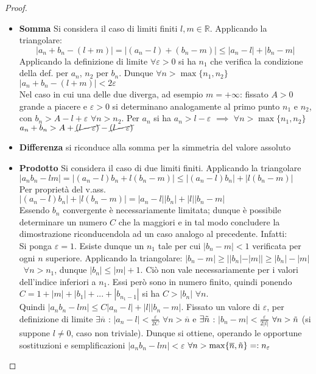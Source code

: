 \documentclass[10pt, oneside]{book}
\theoremstyle{plain}
\begin{document}
\begin{proof}
\begin{itemize}
    \item \textbf{Somma} Si considera il caso di limiti finiti $l, m \in \mathbb{R}$. Applicando la triangolare:
    \[|a_n + b_n - (l+m)| = |(a_n - l) + (b_n - m)| \leq |a_n - l| + |b_n - m|\]
    Applicando la definizione di limite $\forall \varepsilon > 0$ si ha $n_1$ che verifica la condizione della def. per $a_n$, $n_2$ per $b_n$. Dunque $\forall n > \max\{n_1, n_2\}$ $|a_n + b_n - (l+m)| < 2\varepsilon$
    \\Nel caso in cui una delle due diverga, ad esempio $m = +\infty$: fissato $A>0$ grande a piacere e $\varepsilon >0$ si determinano analogamente al primo punto $n_1$ e $n_2$, con $b_n > A - l + \varepsilon$ $\forall n > n_2$. Per $a_n$ si ha $a_n > l - \varepsilon$ $\implies$ $\forall n > \max\{n_1, n_2\}$ $a_n + b_n > A + \cancel{(l - \varepsilon)} - \cancel{(l - \varepsilon)}$
    \item \textbf{Differenza} si riconduce alla somma per la simmetria del valore assoluto
    \item \textbf{Prodotto} Si considera il caso di due limiti finiti. Applicando la triangolare
    $|a_n b_n - l m| = |(a_n - l) b_n + l (b_n - m)| \leq |(a_n - l) b_n| + |l (b_n - m)|$
    \\Per proprietà del v.ass. $|(a_n - l) b_n| + |l (b_n - m)| = |a_n - l||b_n| + |l||b_n - m|$
    \\Essendo $b_n$ convergente è necessariamente limitata; dunque è possibile determinare un numero $C$ che la maggiori e in tal modo concludere la dimostrazione riconducendola ad un caso analogo al precedente. Infatti:
    \\Si ponga $\varepsilon = 1$. Esiste dunque un $n_1$ tale per cui $|b_n -m| < 1$ verificata per ogni $n$ superiore. Applicando la triangolare: $|b_n - m| \geq ||b_n| - |m|| \geq |b_n| - |m|$  \, $\forall n > n_1$, dunque $|b_n| \leq |m| + 1$. Ciò non vale necessariamente per i valori dell'indice inferiori a $n_1$. Essi però sono in numero finito, quindi ponendo $C = 1 + |m| + |b_1| + ... + |b_{n_1-1}|$ si ha $C > |b_n|$ $\forall n$.
    \\Quindi $\displaystyle |a_n b_n - l m| \leq C |a_n - l| + |l| |b_n - m|$. Fissato un valore di $\varepsilon$, per definizione di limite $\displaystyle \exists \overline{n}$ : $|a_n - l| < \frac{\varepsilon}{2C}$ $\forall n > \overline{n}$ e $\exists \Tilde{n}$ : $\displaystyle |b_n - m| < \frac{\varepsilon}{2|l|}$ $\forall n > \Tilde{n}$ (si suppone $l \neq 0$, caso non triviale). Dunque si ottiene, operando le opportune sostituzioni e semplificazioni $\displaystyle |a_n b_n - l m| < \varepsilon$ $\forall n > \max \{\overline{n}, \Tilde{n}\} =: n_\varepsilon$

\end{itemize}
\end{proof}
\end{document}
